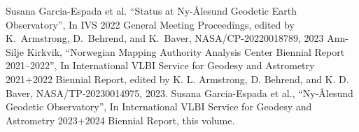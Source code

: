 \documentclass[twocolumn,twoside]{svmultivs_br} %
\begin{document}
%
%
%
\begin{thebibliography}{99}

Susana Garcia-Espada et al. ``Status at Ny-Ålesund Geodetic Earth Observatory'',
In IVS 2022 General Meeting Proceedings, edited by K.\ Armstrong, D.\ Behrend, and K.\ Baver,
NASA/CP-20220018789, 2023
Ann-Silje Kirkvik, ``Norwegian Mapping Authority Analysis Center Biennial Report 2021--2022'',
In International VLBI Service for Geodesy and Astrometry 2021+2022 Biennial Report, 
edited by K. L. Armstrong, D. Behrend, and K. D. Baver, NASA/TP-20230014975, 2023.
Susana Garcia-Espada et al., ``Ny-\AA lesund Geodetic Observatory'', 
In International VLBI Service for Geodesy and Astrometry 2023+2024 Biennial Report,
this volume.

\end{thebibliography}
%
\end{document}
